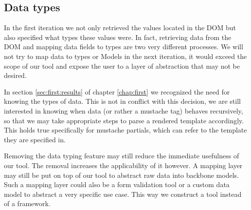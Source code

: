 \documentclass[thesis.tex]{subfiles}
\begin{document}
\subsection{Data types}
In the first iteration we not only retrieved the values located in the DOM but
also specified what types these values were. In fact, retrieving data from the
DOM and mapping data fields to types are two very different processes. We will
not try to map data to types or Models in the next iteration, it would exceed
the scope of our tool and expose the user to a layer of abstraction that may not
be desired.

In section \ref{sec:first:results} of chapter \ref{chap:first} we
recognized the need for knowing the types of data.
This is not in conflict with this decision, we are still interested in
knowing when data (or rather a mustache tag) behaves recursively, so that we may
take appropriate steps to parse a rendered template accordingly. This holds true
specifically for mustache partials, which can refer to the template they are
specified in.

Removing the data typing feature may still reduce the immediate usefulness
of our tool. The removal increases the applicability of it however.
A mapping layer may still be put on top of our tool to abstract raw data
into backbone models.
Such a mapping layer could also be a form validation tool or a custom
data model to abstract a very specific use case.
This way we construct a tool instead of a framework.




\end{document}

